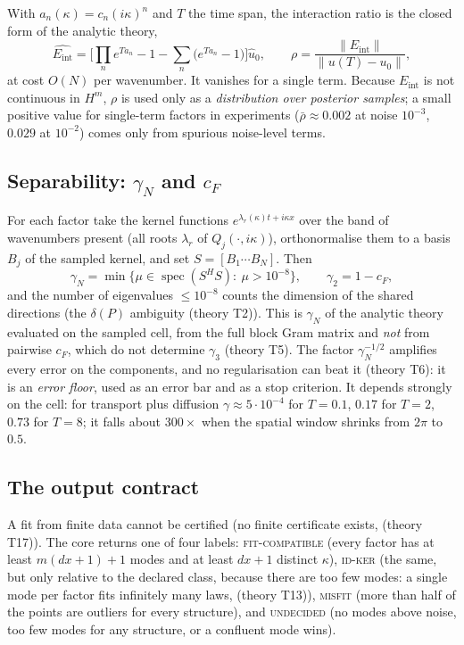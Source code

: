 \documentclass[11pt,a4paper]{article}
\theoremstyle{definition}
\newcommand{\Eint}{E_{\mathrm{int}}}
\newcommand{\thy}[1]{\textcolor{cG}{\textsf{\footnotesize(theory #1)}}}
\begin{document}
With $a_n(\kappa)=c_n(i\kappa)^n$ and $T$ the time span, the interaction ratio is the closed form of the analytic theory,
\begin{equation}\label{eq:rho}
\widehat{\Eint}=\Big[\prod_ne^{Ta_n}-1-\sum_n\big(e^{Ta_n}-1\big)\Big]\hat u_0,\qquad
\rho=\frac{\|\Eint\|}{\|u(T)-u_0\|},
\end{equation}
at cost $O(N)$ per wavenumber. It vanishes for a single term. Because $\Eint$ is not continuous in $H^m$, $\rho$ is used only as a \emph{distribution over posterior samples}; a small positive value for single-term factors in experiments ($\bar\rho\approx0.002$ at noise $10^{-3}$, $0.029$ at $10^{-2}$) comes only from spurious noise-level terms.

\subsection{Separability: $\gamma_N$ and $c_F$}
For each factor take the kernel functions $e^{\lambda_r(\kappa)t+i\kappa x}$ over the band of wavenumbers present (all roots $\lambda_r$ of $Q_j(\cdot,i\kappa)$), orthonormalise them to a basis $B_j$ of the sampled kernel, and set $S=[B_1\cdots B_N]$. Then
\begin{equation}\label{eq:gammaN}
\gamma_N=\min\{\mu\in\operatorname{spec}(S^{H}S):\ \mu>10^{-8}\},\qquad \gamma_2=1-c_F,
\end{equation}
and the number of eigenvalues $\le10^{-8}$ counts the dimension of the shared directions (the $\delta(P)$ ambiguity \thy{T2}). This is $\gamma_N$ of the analytic theory evaluated on the sampled cell, from the full block Gram matrix and \emph{not} from pairwise $c_F$, which do not determine $\gamma_3$ \thy{T5}. The factor $\gamma_N^{-1/2}$ amplifies every error on the components, and no regularisation can beat it \thy{T6}: it is an \emph{error floor}, used as an error bar and as a stop criterion. It depends strongly on the cell: for transport plus diffusion $\gamma\approx5\cdot10^{-4}$ for $T=0.1$, $0.17$ for $T=2$, $0.73$ for $T=8$; it falls about $300\times$ when the spatial window shrinks from $2\pi$ to $0.5$.

\subsection{The output contract}
\begin{caution}[title=The core never says ``identified'']
A fit from finite data cannot be certified (no finite certificate exists, \thy{T17}). The core returns one of four labels: \textsc{fit-compatible} (every factor has at least $m(dx+1)+1$ modes and at least $dx+1$ distinct $\kappa$), \textsc{id-ker} (the same, but only relative to the declared class, because there are too few modes: a single mode per factor fits infinitely many laws, \thy{T13}), \textsc{misfit} (more than half of the points are outliers for every structure), and \textsc{undecided} (no modes above noise, too few modes for any structure, or a confluent mode wins).
\end{caution}
\end{document}
